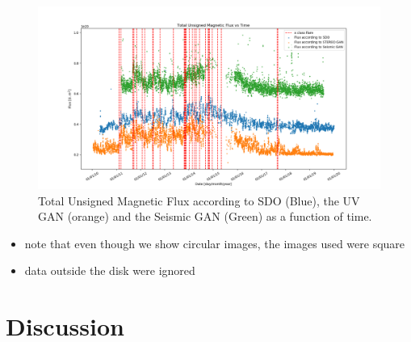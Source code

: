 \documentclass[11pt,a4paper,onecolumn]{report}
\begin{document}
\begin{figure}
  \centering
  \includegraphics[width=\linewidth]{Flux_vs_time.png}
  \caption{Total Unsigned Magnetic Flux according to SDO (Blue), the UV GAN
  (orange) and the Seismic GAN (Green) as a function of time. }
  \label{fig:flux_vs_time}
\end{figure}


\begin{itemize}
  \item note that even though we show circular images, the images used were square
  \item data outside the disk were ignored 
\end{itemize}

%
%
%
%
%
\chapter{Discussion}
\label{chap:discussion}
%
%
%
%
%
\end{document}
